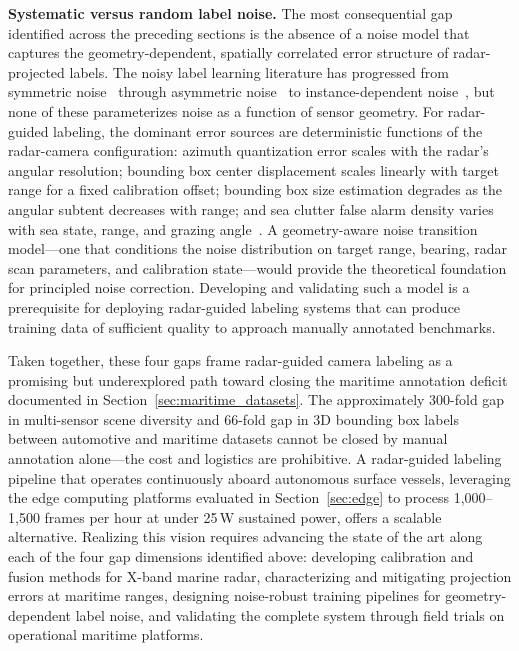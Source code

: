 \textbf{Systematic versus random label noise.} The most consequential gap identified across the preceding sections is the absence of a noise model that captures the geometry-dependent, spatially correlated error structure of radar-projected labels. The noisy label learning literature has progressed from symmetric noise~\cite{natarajan2013learning} through asymmetric noise~\cite{patrini2017making} to instance-dependent noise~\cite{cheng2022instance}, but none of these parameterizes noise as a function of sensor geometry. For radar-guided labeling, the dominant error sources are deterministic functions of the radar-camera configuration: azimuth quantization error scales with the radar's angular resolution; bounding box center displacement scales linearly with target range for a fixed calibration offset; bounding box size estimation degrades as the angular subtent decreases with range; and sea clutter false alarm density varies with sea state, range, and grazing angle~\cite{Ward2006}. A geometry-aware noise transition model---one that conditions the noise distribution on target range, bearing, radar scan parameters, and calibration state---would provide the theoretical foundation for principled noise correction. Developing and validating such a model is a prerequisite for deploying radar-guided labeling systems that can produce training data of sufficient quality to approach manually annotated benchmarks.

Taken together, these four gaps frame radar-guided camera labeling as a promising but underexplored path toward closing the maritime annotation deficit documented in Section~\ref{sec:maritime_datasets}. The approximately 300-fold gap in multi-sensor scene diversity and 66-fold gap in 3D bounding box labels between automotive and maritime datasets cannot be closed by manual annotation alone---the cost and logistics are prohibitive. A radar-guided labeling pipeline that operates continuously aboard autonomous surface vessels, leveraging the edge computing platforms evaluated in Section~\ref{sec:edge} to process 1,000--1,500 frames per hour at under 25\,W sustained power, offers a scalable alternative. Realizing this vision requires advancing the state of the art along each of the four gap dimensions identified above: developing calibration and fusion methods for X-band marine radar, characterizing and mitigating projection errors at maritime ranges, designing noise-robust training pipelines for geometry-dependent label noise, and validating the complete system through field trials on operational maritime platforms.
